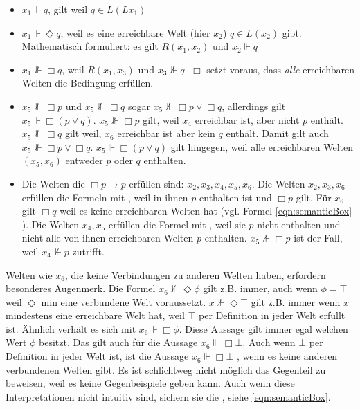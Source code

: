 \begin{itemize}
	\item $x_1 \Vdash q$, gilt weil $q \in L(Lx_1)$
	\item $x_1 \Vdash \Diamond q$, weil es eine erreichbare Welt (hier $x_2$) $q \in L(x_2)$ gibt. Mathematisch formuliert: es gilt $R(x_1, x_2)$ und $x_2 \Vdash q$
	\item $x_1 \nVdash \Box q$, weil $R(x_1,x_3)$ und $x_3 \nVdash q$. $\Box$ setzt voraus, dass \emph{alle} erreichbaren Welten die Bedingung erfüllen.
	\item $x_5 \nVdash \Box p$ und $x_5 \nVdash \Box q$ sogar $x_5 \nVdash \Box p \vee \Box q$, allerdings gilt $x_5 \Vdash \Box (p \vee q)$. $x_5 \nVdash \Box p$ gilt, weil $x_4$ erreichbar ist, aber nicht $p$ enthält. $x_5 \nVdash \Box q$ gilt weil, $x_6$ erreichbar ist aber kein $q$ enthält. Damit gilt auch $x_5 \nVdash \Box p \vee \Box q$. $x_5 \Vdash \Box (p \vee q)$ gilt hingegen, weil alle erreichbaren Welten $(x_5, x_6)$ entweder $p$ oder $q$ enthalten.
	\item Die Welten die $\Box p \rightarrow p$ erfüllen sind: $x_2, x_3, x_4, x_5, x_6$.
	Die Welten $x_2, x_3, x_6$ erfüllen die Formeln mit \true, weil in ihnen $p$ enthalten ist und $\Box p$ gilt. Für $x_6$ gilt $\Box q$ weil es keine erreichbaren Welten hat (vgl. Formel \eqref{eqn:semanticBox} ).
	Die Welten $x_4, x_5$ erfüllen die Formel mit \false, weil sie $p$ nicht enthalten und nicht alle von ihnen erreichbaren Welten $p$ enthalten. $x_5 \nVdash \Box p$ ist der Fall, weil $x_4 \nVdash p$ zutrifft.
\end{itemize}
%
Welten wie $x_6$, die keine Verbindungen zu anderen Welten haben, erfordern besonderes Augenmerk.
Die Formel $x_6 \nVdash \Diamond \phi$ gilt z.B. immer, auch wenn $\phi = \top$ weil $\Diamond$ min eine verbundene Welt voraussetzt.
$x \nVdash \Diamond \top$ gilt z.B. immer wenn $x$ mindestens eine erreichbare Welt hat, weil $\top$ per Definition in jeder Welt erfüllt ist.
Ähnlich verhält es sich mit $x_6 \Vdash \Box \phi$. Diese Aussage gilt immer egal welchen Wert $\phi$ besitzt.
Das gilt auch für die Aussage $x_6 \Vdash \Box \bot$. 
Auch wenn $\bot$ per Definition in jeder Welt \false ist, ist die Aussage $x_6 \Vdash \Box \bot$ \true, wenn es keine anderen verbundenen Welten gibt.
Es ist schlichtweg nicht möglich das Gegenteil zu beweisen, weil es keine Gegenbeispiele geben kann.
Auch wenn diese Interpretationen nicht intuitiv sind, sichern sie die \deMorganBedingung, siehe \eqref{eqn:semanticBox}.
%
%
